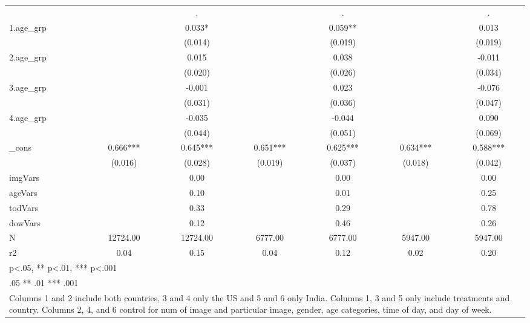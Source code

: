 {\begin{tabular}{l*{6}{c}}
            &               &           .   &               &           .   &               &           .   \\
[1em]
1.age\_grp   &               &       0.033*  &               &       0.059** &               &       0.013   \\
            &               &     (0.014)   &               &     (0.019)   &               &     (0.019)   \\
[1em]
2.age\_grp   &               &       0.015   &               &       0.038   &               &      -0.011   \\
            &               &     (0.020)   &               &     (0.026)   &               &     (0.034)   \\
[1em]
3.age\_grp   &               &      -0.001   &               &       0.023   &               &      -0.076   \\
            &               &     (0.031)   &               &     (0.036)   &               &     (0.047)   \\
[1em]
4.age\_grp   &               &      -0.035   &               &      -0.044   &               &       0.090   \\
            &               &     (0.044)   &               &     (0.051)   &               &     (0.069)   \\
[1em]
\_cons      &       0.666***&       0.645***&       0.651***&       0.625***&       0.634***&       0.588***\\
            &     (0.016)   &     (0.028)   &     (0.019)   &     (0.037)   &     (0.018)   &     (0.042)   \\
\hline
imgVars     &               &        0.00   &               &        0.00   &               &        0.00   \\
ageVars     &               &        0.10   &               &        0.01   &               &        0.25   \\
todVars     &               &        0.33   &               &        0.29   &               &        0.78   \\
dowVars     &               &        0.12   &               &        0.46   &               &        0.26   \\
N           &    12724.00   &    12724.00   &     6777.00   &     6777.00   &     5947.00   &     5947.00   \\
r2          &        0.04   &        0.15   &        0.04   &        0.12   &        0.02   &        0.20   \\
\hline\hline
\multicolumn{7}{l}{\footnotesize * p<.05, ** p<.01, *** p<.001}\\
\multicolumn{7}{l}{\footnotesize * .05 ** .01 *** .001}\\
\multicolumn{7}{l}{\footnotesize Columns 1 and 2 include both countries, 3 and 4 only the US and 5 and 6 only India. Columns 1, 3 and 5 only include treatments and country. Columns 2, 4, and 6 control for num of image and particular image, gender, age categories, time of day, and day of week.}\\
\end{tabular}
}
